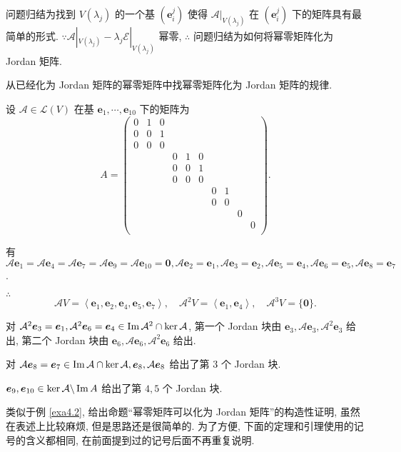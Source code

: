 \documentclass{ctexart}
\begin{document}
问题归结为找到 $V(\lambda_j)$ 的一个基 $(\boldsymbol{e}^j_i)$ 使得 $\mathcal{A}|_{V(\lambda_j)}$ 在 $(\boldsymbol{e}^j_i)$ 下的矩阵具有最简单的形式. $\because\mathcal{A}|_{V(\lambda_j)}-\lambda_j\mathcal{E}|_{V(\lambda_j)}$ 幂零, $\therefore$ 问题归结为如何将幂零矩阵化为 Jordan 矩阵.

从已经化为 Jordan 矩阵的幂零矩阵中找幂零矩阵化为 Jordan 矩阵的规律.
\begin{example}\label{exa4.2}
    设 $\mathcal{A}\in\mathcal{L}(V)$ 在基 $\boldsymbol{e}_1,\cdots,\boldsymbol{e}_{10}$ 下的矩阵为
    \[A=\begin{pmatrix}
        0 & 1 & 0 \\
        0 & 0 & 1 \\
        0 & 0 & 0 \\
        &&& 0 & 1 & 0 \\
        &&& 0 & 0 & 1 \\
        &&& 0 & 0 & 0 \\
        &&&&&& 0 & 1 \\
        &&&&&& 0 & 0 \\
        &&&&&&&& 0 \\
        &&&&&&&&& 0 \\
    \end{pmatrix}.\]

    有 $\mathcal{A}\boldsymbol{e}_1=\mathcal{A}\boldsymbol{e}_4=\mathcal{A}\boldsymbol{e}_7=\mathcal{A}\boldsymbol{e}_9=\mathcal{A}\boldsymbol{e}_{10}=\boldsymbol{0},\mathcal{A}\boldsymbol{e}_2=\boldsymbol{e}_1,\mathcal{A}\boldsymbol{e}_3=\boldsymbol{e}_2,\mathcal{A}\boldsymbol{e}_5=\boldsymbol{e}_4,\mathcal{A}\boldsymbol{e}_6=\boldsymbol{e}_5,\mathcal{A}\boldsymbol{e}_8=\boldsymbol{e}_7$.

    $\therefore$
    \[\mathcal{A}V=\left<\boldsymbol{e}_1,\boldsymbol{e}_2,\boldsymbol{e}_4,\boldsymbol{e}_5,\boldsymbol{e}_7\right>,\quad\mathcal{A}^2V=\left<\boldsymbol{e}_1,\boldsymbol{e}_4\right>,\quad\mathcal{A}^3V=\{\boldsymbol{0}\}.\]

    对 $\mathcal{A}^2\boldsymbol{e}_3=\boldsymbol{e}_1,\mathcal{A}^2\boldsymbol{e}_6=\boldsymbol{e}_4\in\operatorname{Im} \mathcal{A}^2\cap\ker\mathcal{A}$, 第一个 Jordan 块由 $\boldsymbol{e}_3,\mathcal{A}\boldsymbol{e}_3,\mathcal{A}^2\boldsymbol{e}_3$ 给出, 第二个 Jordan 块由 $\boldsymbol{e}_6,\mathcal{A}\boldsymbol{e}_6,\mathcal{A}^2\boldsymbol{e}_6$ 给出.

    对 $\mathcal{A}\boldsymbol{e}_8=\boldsymbol{e}_7\in\operatorname{Im} \mathcal{A}\cap\ker\mathcal{A},\boldsymbol{e}_8,\mathcal{A}\boldsymbol{e}_8$ 给出了第 $3$ 个 Jordan 块.

    $\boldsymbol{e}_9,\boldsymbol{e}_{10}\in\ker\mathcal{A}\backslash\operatorname{Im} A$ 给出了第 $4,5$ 个 Jordan 块.
\end{example}
类似于例 \ref{exa4.2}, 给出命题``幂零矩阵可以化为 Jordan 矩阵''的构造性证明, 虽然在表述上比较麻烦, 但是思路还是很简单的. 为了方便, 下面的定理和引理使用的记号的含义都相同, 在前面提到过的记号后面不再重复说明.
\end{document}
